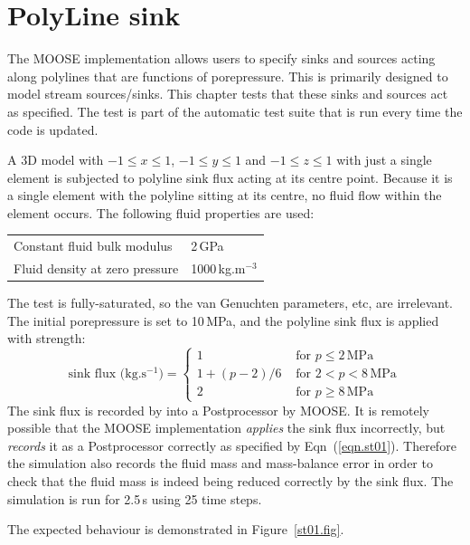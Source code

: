 \documentclass[]{scrreprt}
\begin{document}
\chapter{PolyLine sink}
\label{st}

The MOOSE implementation allows users to specify sinks and sources
acting along polylines that are functions of porepressure.  This is
primarily designed to model stream sources/sinks.  This chapter
tests that these sinks and sources act as specified.  The test is
part of the automatic test suite that is run every time the code is
updated.

A 3D model with $-1\leq x \leq 1$, $-1\leq y \leq 1$ and $-1\leq z
\leq 1$ with just a
single element is subjected to polyline sink flux acting at its
centre point.  Because it is a single element with the polyline
sitting at its centre, no fluid flow within the
element occurs.  The following fluid properties are used:
\begin{center}
\begin{tabular}{|ll|}
\hline
Constant fluid bulk modulus & 2\,GPa \\
Fluid density at zero pressure & 1000\,kg.m$^{-3}$ \\
\hline
\end{tabular} 
\end{center}
The test is fully-saturated, so the van Genuchten parameters, etc, are
irrelevant.  The initial porepressure is set to 10\,MPa, and the
polyline sink flux is applied with strength:
\begin{equation}
\mbox{sink flux (kg.s$^{-1}$)} = \left\{
\begin{array}{ll}
1 & \mbox{ for } p \leq 2\,\mbox{MPa} \\
1 + (p - 2)/6 & \mbox{ for } 2<p<8\,\mbox{MPa} \\
2 & \mbox{ for } p\geq 8\,\mbox{MPa}
\end{array}
\right.
\label{eqn.st01}
\end{equation}
The sink flux is recorded by into a Postprocessor by MOOSE.  It is
remotely possible that the MOOSE implementation {\em applies} the sink
flux incorrectly, but {\em records} it as a Postprocessor correctly as
specified by Eqn~(\ref{eqn.st01}).  Therefore the simulation also
records the fluid mass and mass-balance error in order to check that
the fluid mass is indeed being reduced correctly by the sink flux.
The simulation is run for 2.5\,s using 25 time steps.

The expected behaviour is demonstrated in Figure~\ref{st01.fig}.
\end{document}
